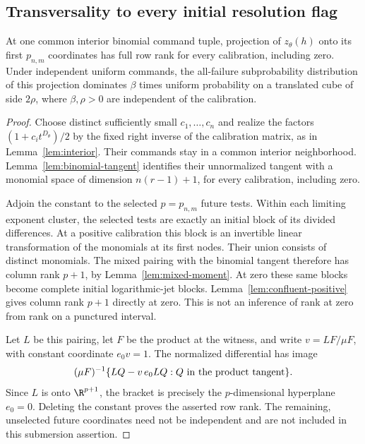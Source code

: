 \subsection{Transversality to every initial resolution flag}
\begin{lemma}\label{lem:attained-flag}
At one common interior binomial command tuple, projection of
$z_\theta(h)$ onto its first $p_{n,m}$ coordinates has full row rank
for every calibration, including zero. Under independent uniform commands,
the all-failure subprobability distribution of this projection dominates
$\beta$ times uniform probability on a translated cube of side $2\rho$,
where $\beta,\rho>0$ are independent of the calibration.
\end{lemma}
\begin{proof}
Choose distinct sufficiently small $c_1,\ldots,c_n$ and realize the
factors $(1+c_it^{D_\theta})/2$ by the fixed right inverse of the
calibration matrix, as in Lemma~\ref{lem:interior}. Their commands stay
in a common interior neighborhood. Lemma~\ref{lem:binomial-tangent}
identifies their unnormalized tangent with a monomial space of dimension
$n(r-1)+1$, for every calibration, including zero.

Adjoin the constant to the selected $p=p_{n,m}$ future tests. Within
each limiting exponent cluster, the selected tests are exactly an initial
block of its divided differences. At a positive calibration this block
is an invertible linear transformation of the monomials at its first
nodes. Their union consists of distinct monomials. The mixed pairing
with the binomial tangent therefore has column rank $p+1$, by
Lemma~\ref{lem:mixed-moment}. At zero these same blocks become complete
initial logarithmic-jet blocks. Lemma~\ref{lem:confluent-positive}
gives column rank $p+1$ directly at zero. This is not an inference of
rank at zero from rank on a punctured interval.

Let $L$ be this pairing, let $F$ be the product at the witness, and
write $v=LF/\mu F$, with constant coordinate $e_0v=1$.
The normalized differential has image
\[
 (\mu F)^{-1}\{LQ-v\,e_0LQ:Q\hbox{ in the product tangent}\}.
\]
Since $L$ is onto $\R^{p+1}$, the bracket is precisely the
$p$-dimensional hyperplane $e_0=0$. Deleting the constant proves the
asserted row rank. The remaining, unselected future coordinates need not
be independent and are not included in this submersion assertion.


\end{proof}
